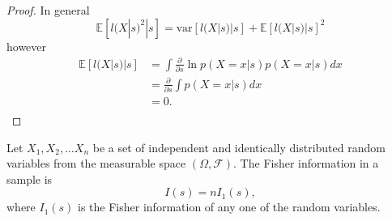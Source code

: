 \begin{proof}
	In general 
	\begin{equation}
		\mathbb{E} [l(X|s)^2|s] = \text{var}[l(X|s)|s]+\mathbb{E}[l(X|s)|s]^2
	\end{equation}
	however
	\begin{equation}
		\begin{split}
			\mathbb{E}[l(X|s)|s] &= \int  \frac{\partial}{\partial s} \ln p(X=x|s) p(X=x|s) dx\\
			&= \frac{\partial}{\partial s}\int  p(X=x|s) dx\\
			&= 0.\\
		\end{split}
	\end{equation}
\end{proof}


\begin{theorem}
	Let $X_1,X_2,\dots X_n$ be a set of independent and identically distributed random variables from the measurable space $(\Omega,\mathcal{F})$. The Fisher information in a sample is 
	\begin{equation}
		I(s) = nI_1(s),
	\end{equation}
	where $I_1(s)$ is the Fisher information of any one of the random variables.
\end{theorem}









